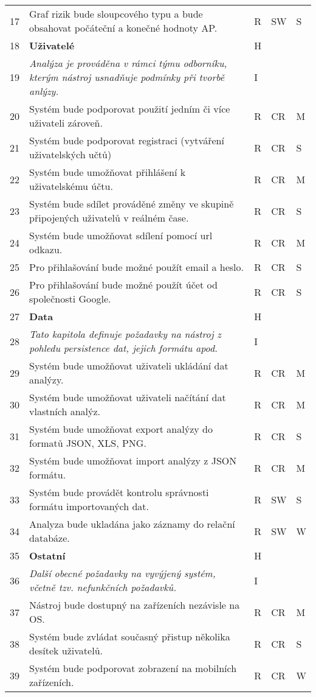 \begin{longtable}{|p{0.5cm} | p{12cm} | p{0.5cm} | p{0.75cm} | p{0.5cm} |}
17 & Graf rizik bude sloupcového typu a bude obsahovat počáteční a konečné hodnoty AP. &	R&	SW &S\\
 18 &	\textbf{Uživatelé}  &	H & & \\
19 &	\textit{Analýza je prováděna v rámci týmu odborníku, kterým nástroj usnadňuje podmínky při tvorbě anlýzy.
} &	I	&& \\
20 &	Systém bude podporovat použití jedním či více uživateli zároveň.&	R&	CR&M\\
21&	Systém bude podporovat registraci (vytváření uživatelských učtů)	&R	&CR&S\\
22&	Systém bude umožňovat přihlášení k uživatelskému účtu.&	R&	CR&M\\
23&		Systém bude sdílet prováděné změny ve skupině připojených uživatelů v reálném čase. &	R&	CR&S\\
24&		Systém bude umožňovat sdílení pomocí url odkazu.&	R&	CR&M\\
25&		Pro přihlašování bude možné použít email a heslo.  &	R&	CR&S\\
26&		Pro přihlašování bude možné použít účet od společnosti Google. &	R&	CR&S\\

27 &	\textbf{Data}  &	H & & \\
28 &	\textit{Tato kapitola definuje požadavky na nástroj z pohledu persistence dat, jejich formátu apod.} &	I	&& \\
29 &	Systém bude umožňovat uživateli ukládání dat analýzy. &	R&	CR&M\\
30 &	Systém bude umožňovat uživateli načítání dat vlastních analýz. &	R&	CR&M\\
31 &	Systém bude umožňovat export analýzy do formatů JSON, XLS, PNG. &	R &	CR & S\\
32 &	Systém bude umožňovat import analýzy z JSON formátu. &	R &	CR & M\\
33 &	Systém bude provádět kontrolu správnosti formátu importovaných dat. & 	R &	SW & S\\
34 &	Analyza bude ukladána jako záznamy do relační databáze.& 	R&	SW&W\\
35&	\textbf{Ostatní}  &	H & & \\
36 &	\textit{Další obecné požadavky na vyvýjený systém, včetně tzv. nefunkčních požadavků.} &	I	&& \\
37	& Nástroj bude dostupný na zařízeních nezávisle na OS. &	R&	CR& M\\
38	& Systém bude zvládat současný přistup několika desítek uživatelů. &	R&	CR& S\\
39	& Systém bude podporovat zobrazení na mobilních zařízeních.	&R	&CR&W\\ \hline
\end{longtable}

